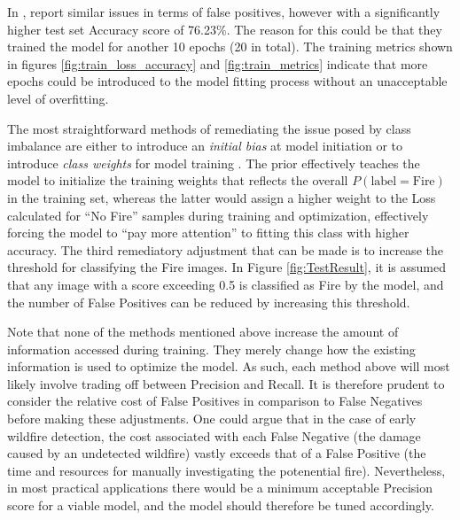 \documentclass[a4paper,11pt]{article} %
\begin{document}
In \cite{FLAME_dataset},  report similar issues in terms of false positives, however with a significantly higher
test set Accuracy score of 76.23\%. The reason for this could be that they trained the model for another 10 epochs (20 in total).
The training metrics shown in figures \ref{fig:train_loss_accuracy} and \ref{fig:train_metrics} indicate that more epochs could be
introduced to the model fitting process without an unacceptable level of overfitting.

\medskip

The most straightforward methods of remediating the issue posed by class imbalance are either to introduce an \emph{initial bias} at model
initiation or to introduce \emph{class weights} for model training \cite{TF_Imbalanced_data_tutorial}. The prior effectively teaches the model to
initialize the training weights that reflects the overall $P(\text{label}=\text{Fire})$ in the training set, whereas the latter would assign
a higher weight to the Loss calculated for ``No Fire'' samples during training and optimization, effectively forcing the model to ``pay more attention''
to fitting this class with higher accuracy. The third remediatory adjustment that can be made is to increase the threshold for classifying the Fire images.
In Figure \ref{fig:TestResult}, it is assumed that any image with a score exceeding 0.5 is classified as Fire by the model, and the number
of False Positives can be reduced by increasing this threshold.

\medskip

Note that none of the methods mentioned above increase the amount of information accessed during training. They merely change how the existing information is used to optimize the model. 
As such, each method above will most likely involve trading off between Precision and Recall. It is therefore prudent to consider the relative
cost of False Positives in comparison to False Negatives before making these adjustments. One could argue that in the case of early wildfire detection, the cost
associated with each False Negative (the damage caused by an undetected wildfire) vastly exceeds that of a False Positive (the time and resources for manually investigating the potenential fire).
Nevertheless, in most practical applications there would be a minimum acceptable Precision score for a viable model, and the model should therefore be tuned accordingly.
\end{document}
